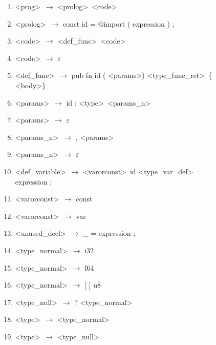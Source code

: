 \documentclass[a4paper, 11pt]{article}
\begin{document}
\begin{figure}[ht]
    \begin{center}
    \begin{enumerate}
        \itemsep-0.5em
        \item \textless prog\textgreater\  $\to$ \textless prolog\textgreater\ \textless code\textgreater
        \item \textless prolog\textgreater\ $\to$ const id = @import ( expression ) ;
        \item \textless code\textgreater\ $\to$ \textless def\_func\textgreater\ \textless code\textgreater
        \item \textless code\textgreater\ $\to$ $\varepsilon$
        \item \textless def\_func\textgreater\ $\to$ pub fn id ( \textless params\textgreater ) \textless type\_func\_ret\textgreater\ \{ \textless body\textgreater \}
        \item \textless params\textgreater\ $\to$ id : \textless type\textgreater\ \textless params\_n\textgreater
        \item \textless params\textgreater\ $\to$ $\varepsilon$
        \item \textless params\_n\textgreater\ $\to$ , \textless params\textgreater
        \item \textless params\_n\textgreater\ $\to$ $\varepsilon$
        \item \textless def\_variable\textgreater\ $\to$ \textless varorconst\textgreater\ id \textless type\_var\_def\textgreater\ = expression ;
        \item \textless varorconst\textgreater\ $\to$ const
        \item \textless varorconst\textgreater\ $\to$ var
        \item \textless unused\_decl\textgreater\ $\to$ \_ = expression ;
        \item \textless type\_normal\textgreater\ $\to$ i32
        \item \textless type\_normal\textgreater\ $\to$ f64
        \item \textless type\_normal\textgreater\ $\to$ [ ] u8
        \item \textless type\_null\textgreater\ $\to$ ? \textless type\_normal\textgreater
        \item \textless type\textgreater\ $\to$ \textless type\_normal\textgreater
        \item \textless type\textgreater\ $\to$ \textless type\_null\textgreater

\end{enumerate}
\end{center}
\end{figure}
\end{document}
